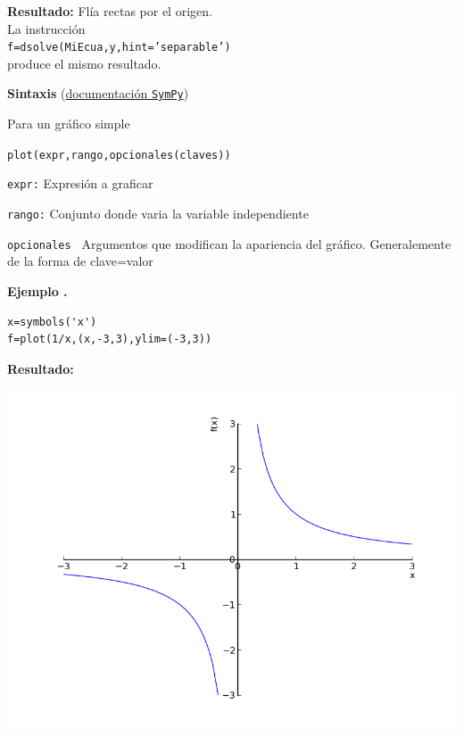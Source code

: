 \documentclass{article}
\newcounter{ejemplo_cont}
\newenvironment{ejemplo}{\noindent\textbf{Ejemplo  \arabic{ejemplo_cont}.} }{\addtocounter{ejemplo_cont}{1}}
\begin{document}
\noindent\textbf{Resultado:}
Flía rectas  por el origen. \\
La instrucción\\
\texttt{f=dsolve(MiEcua,y,hint='separable')}
\\produce el mismo resultado.






\begin{codigo}

\textbf{Sintaxis} (\href{http://docs.sympy.org/latest/modules/plotting.html}{documentación \texttt{SymPy}})

Para un gráfico simple

\texttt{plot(expr,rango,opcionales(claves))}

\texttt{expr:} Expresión a graficar 

\texttt{rango:} Conjunto donde varia la variable independiente 

\texttt{opcionales } Argumentos que modifican la apariencia del gráfico. Generalemente de la forma de clave=valor

\end{codigo}


\begin{ejemplo}

\end{ejemplo}


\begin{lstlisting}
x=symbols('x')
f=plot(1/x,(x,-3,3),ylim=(-3,3))
\end{lstlisting}

\noindent\textbf{Resultado:}
\begin{center}
\includegraphics[scale=.35]{imagenes/ejemplo_plot.png}
\end{center}
\end{document}
